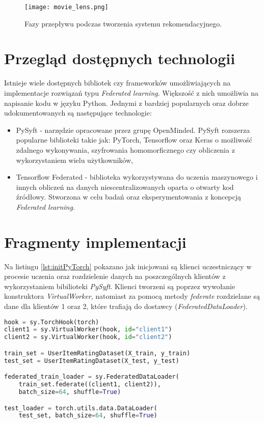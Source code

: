 \begin{figure}[h]
    \texttt{[image: movie\_lens.png]}
    \caption{Fazy przepływu podczas tworzenia systemu rekomendacyjnego.}
    \label{fig:movie_lens}
\end{figure}

\section{Przegląd dostępnych technologii}

Istnieje wiele dostępnych bibliotek czy frameworków umożliwiających na implementacje rozwiązań typu \textit{Federated learning}. Większość z nich umożliwia na napisanie kodu w języku Python. Jednymi z bardziej popularnych oraz dobrze udokumentowanych są następujące technologie:

\begin{itemize}
    \item PySyft - narzędzie opracowane przez grupę OpenMinded. PySyft rozszerza popularne biblioteki takie jak: PyTorch, Tensorflow oraz Keras o możliwość zdalnego wykonywania, szyfrowania homomorficznego czy obliczenia z wykorzystaniem wielu użytkowników,
    \item Tensorflow Federated - biblioteka wykorzystywana do uczenia maszynowego i innych obliczeń na danych niescentralizowanych oparta o otwarty kod źródłowy. Stworzona w celu badań oraz eksperymentowania z koncepcją \textit{Federated learning}.
\end{itemize}

\section{Fragmenty implementacji}

Na listingu \ref{lst:initPyTorch} pokazano jak inicjowani są klienci uczestniczący w procesie uczenia oraz rozdzielenie danych na poszczególnych klientów z wykorzystaniem bibilioteki \textit{PySyft}. Klienci tworzeni są poprzez wywołanie konstruktora \textit{VirtualWorker}, natomiast za pomocą metody \textit{federate} rozdzielane są dane dla klientów 1 oraz 2, które trafiają do dostawcy (\textit{FederatedDataLoader}).

\begin{lstlisting}[language=Python, caption={Inicjalizacja klientów oraz podział danych}, label={lst:initPyTorch}, captionpos=b]
hook = sy.TorchHook(torch)
client1 = sy.VirtualWorker(hook, id="client1")
client2 = sy.VirtualWorker(hook, id="client2")

train_set = UserItemRatingDataset(X_train, y_train)
test_set = UserItemRatingDataset(X_test, y_test)

federated_train_loader = sy.FederatedDataLoader(
    train_set.federate((client1, client2)), 
    batch_size=64, shuffle=True)

test_loader = torch.utils.data.DataLoader(
    test_set, batch_size=64, shuffle=True)
\end{lstlisting}

